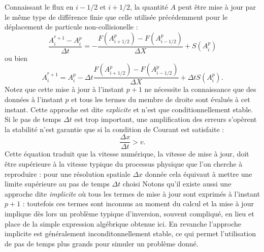  Connaissant le flux en $i-1/2$ et $i+1/2$, la quantité $A$ peut être mise à jour par le même type de différence finie que celle utilisée précédemment pour le déplacement de particule non-collisionelle :
 \begin{equation}
 \frac{A_i^{^p+1}-A_i^p}{\Delta t}=-\frac{F(A_{i+1/2}^p)-F(A_{i-1/2}^p)}{\Delta X}+S(A_i^p)
 \end{equation}
 ou bien
 \begin{equation}
 A_i^{^p+1}=A_i^p-\Delta t \frac{F(A_{i+1/2}^p)-F(A_{i-1/2}^p)}{\Delta X}+\Delta t S(A_i^p).
 \end{equation}
Notez que cette mise à jour à l'instant $p+1$ ne nécessite la connaissance que des données à l'instant $p$ et tous les termes du membre de droite sont évalués à cet instant. Cette approche est dite \textit{explicite} et n'est que conditionnellement stable. Si le pas de temps $\Delta t$ est trop important, une amplification des erreurs s'opèrent la stabilité n'est garantie que si la condition de Courant est satisfaite :
\begin{equation}
\frac{\Delta x}{ \Delta t}> v.
\end{equation}
Cette équation traduit que la vitesse numérique, la vitesse de mise à jour, doit être supérieure à la vitesse typique du processus physique que l'on cherche à reproduire : pour une résolution spatiale $\Delta x$ donnée cela équivaut à mettre une limite supérieure au pas de temps $\Delta t$ choisi  Notons qu'il existe aussi une approche dite \textit{implicite} où tous les termes de mise à jour sont exprimés à l'instant $p+1$ : toutefois ces termes sont inconnus au moment du calcul et la mise à jour implique dès lors un problème typique d'inversion, souvent compliqué, en lieu et place de la simple expression algébrique obtenue ici. En revanche l'approche implicite est généralement inconditonnellement stable, ce qui permet l'utilisation de pas de temps plus grands pour simuler un problème donné.

